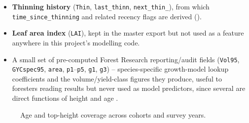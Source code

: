 \begin{itemize}
{  \texttt{CanopyCover} is framed in the environmental feature sets belong in
  Chapter~\ref{ch:methodology}'s feature-set justification and the Results chapter, not here --
  verify those two sections actually carry this through once drafted.}
\item \textbf{Thinning history} (\texttt{Thin}, \texttt{last\_thinn}, \texttt{next\_thin\_}), from
  which \texttt{time\_since\_thinning} and related recency flags are derived
  ().
\item \textbf{Leaf area index} (\texttt{LAI}), kept in the master export but not used as a feature
  anywhere in this project's modelling code. 
\item A small set of pre-computed Forest Research reporting/audit fields
  (\texttt{Vol95}, \texttt{GYCspec95}, \texttt{area}, \texttt{p1}--\texttt{p5}, \texttt{g1},
  \texttt{g3}) -- species-specific growth-model lookup coefficients and the volume/yield-class
  figures they produce, useful to foresters reading results but never used as model
  predictors, since several are direct functions of height and age
  . 
\end{itemize}

\begin{figure}[!htbp]
\centering
{}
\caption{Age and top-height coverage across cohorts and survey years.}
\label{fig:data-target-age}
\end{figure}

